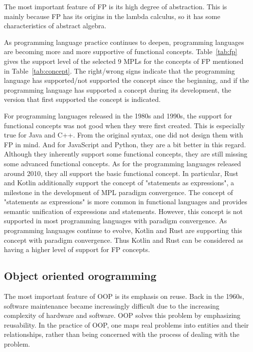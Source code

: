 The most important feature of FP is its high degree of abstraction.
This is mainly because FP has its origins in the lambda calculus,
so it has some characteristics of abstract algebra.


As programming language practice continues to deepen,
programming languages are becoming more and more supportive
of functional concepts.
Table~\ref{tab:fp} gives the support level of the selected 9 MPLs for the concepts
of FP mentioned in Table~\ref{tab:concept}.
The right/wrong signs indicate that the programming language has
supported/not supported the concept since the beginning,
and if the programming language has supported a concept during its development,
the version that first supported the concept is indicated.


For programming languages released in the 1980s and 1990s,
the support for functional concepts was not good when they
were first created.
This is especially true for Java and C++.
From the original syntax, one did not design them with FP in mind.
And for JavaScript and Python, they are a bit better in this regard.
Although they inherently support some functional concepts,
they are still missing some advanced functional concepts.
As for the programming languages released around 2010,
they all support the basic functional concept.
In particular, Rust and Kotlin additionally support the concept
of "statements as expressions", a milestone in the development
of MPL paradigm convergence.
The concept of "statements as expressions"
is more common in functional languages and provides semantic
unification of expressions and statements.
However, this concept is not supported in most programming languages with paradigm convergence.
As programming languages continue to evolve, Kotlin and Rust
are supporting this concept with paradigm convergence.
Thus Kotlin and Rust can be considered as having a higher
level of support for FP concepts.

\subsection{Object oriented orogramming}
The most important feature of OOP is its emphasis on reuse. Back in the 1960s, software maintenance became increasingly difficult due to the increasing complexity of hardware and software. OOP solves this problem by emphasizing reusability. In the practice of OOP, one maps real problems into entities and their relationships, rather than being concerned with the process of dealing with the problem.

